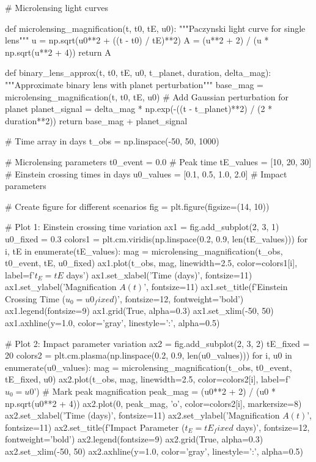 \documentclass[11pt,a4paper]{article}
\begin{document}
\begin{pycode}
# Microlensing light curves

def microlensing_magnification(t, t0, tE, u0):
    """Paczynski light curve for single lens"""
    u = np.sqrt(u0**2 + ((t - t0) / tE)**2)
    A = (u**2 + 2) / (u * np.sqrt(u**2 + 4))
    return A

def binary_lens_approx(t, t0, tE, u0, t_planet, duration, delta_mag):
    """Approximate binary lens with planet perturbation"""
    base_mag = microlensing_magnification(t, t0, tE, u0)
    # Add Gaussian perturbation for planet
    planet_signal = delta_mag * np.exp(-((t - t_planet)**2) / (2 * duration**2))
    return base_mag + planet_signal

# Time array in days
t_obs = np.linspace(-50, 50, 1000)

# Microlensing parameters
t0_event = 0.0  # Peak time
tE_values = [10, 20, 30]  # Einstein crossing times in days
u0_values = [0.1, 0.5, 1.0, 2.0]  # Impact parameters

# Create figure for different scenarios
fig = plt.figure(figsize=(14, 10))

# Plot 1: Einstein crossing time variation
ax1 = fig.add_subplot(2, 3, 1)
u0_fixed = 0.3
colors1 = plt.cm.viridis(np.linspace(0.2, 0.9, len(tE_values)))
for i, tE in enumerate(tE_values):
    mag = microlensing_magnification(t_obs, t0_event, tE, u0_fixed)
    ax1.plot(t_obs, mag, linewidth=2.5, color=colors1[i],
            label=f'$t_E = {tE}$ days')
ax1.set_xlabel('Time (days)', fontsize=11)
ax1.set_ylabel('Magnification $A(t)$', fontsize=11)
ax1.set_title(f'Einstein Crossing Time ($u_0 = {u0_fixed}$)', fontsize=12, fontweight='bold')
ax1.legend(fontsize=9)
ax1.grid(True, alpha=0.3)
ax1.set_xlim(-50, 50)
ax1.axhline(y=1.0, color='gray', linestyle=':', alpha=0.5)

# Plot 2: Impact parameter variation
ax2 = fig.add_subplot(2, 3, 2)
tE_fixed = 20
colors2 = plt.cm.plasma(np.linspace(0.2, 0.9, len(u0_values)))
for i, u0 in enumerate(u0_values):
    mag = microlensing_magnification(t_obs, t0_event, tE_fixed, u0)
    ax2.plot(t_obs, mag, linewidth=2.5, color=colors2[i],
            label=f'$u_0 = {u0}$')
    # Mark peak magnification
    peak_mag = (u0**2 + 2) / (u0 * np.sqrt(u0**2 + 4))
    ax2.plot(0, peak_mag, 'o', color=colors2[i], markersize=8)
ax2.set_xlabel('Time (days)', fontsize=11)
ax2.set_ylabel('Magnification $A(t)$', fontsize=11)
ax2.set_title(f'Impact Parameter ($t_E = {tE_fixed}$ days)', fontsize=12, fontweight='bold')
ax2.legend(fontsize=9)
ax2.grid(True, alpha=0.3)
ax2.set_xlim(-50, 50)
ax2.axhline(y=1.0, color='gray', linestyle=':', alpha=0.5)


\end{pycode}
\end{document}
